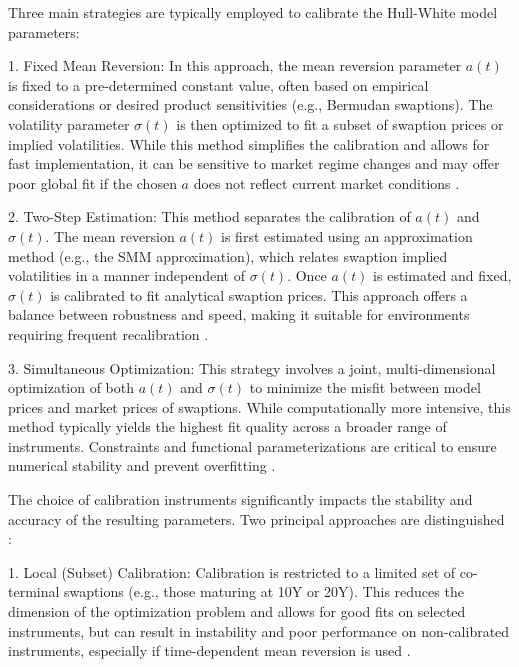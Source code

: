 Three main strategies are typically employed to calibrate the Hull-White model parameters:

1. Fixed Mean Reversion: In this approach, the mean reversion parameter $a(t)$ is fixed to a pre-determined constant value, often based on empirical considerations or desired product sensitivities (e.g., Bermudan swaptions). The volatility parameter $\sigma(t)$ is then optimized to fit a subset of swaption prices or implied volatilities. While this method simplifies the calibration and allows for fast implementation, it can be sensitive to market regime changes and may offer poor global fit if the chosen $a$ does not reflect current market conditions \parencite[p.~13]{gurrieri2009calibration}.

2. Two-Step Estimation: This method separates the calibration of $a(t)$ and $\sigma(t)$. The mean reversion $a(t)$ is first estimated using an approximation method (e.g., the SMM approximation), which relates swaption implied volatilities in a manner independent of $\sigma(t)$. Once $a(t)$ is estimated and fixed, $\sigma(t)$ is calibrated to fit analytical swaption prices. This approach offers a balance between robustness and speed, making it suitable for environments requiring frequent recalibration \parencite[pp.~13--14]{gurrieri2009calibration}.

3. Simultaneous Optimization: This strategy involves a joint, multi-dimensional optimization of both $a(t)$ and $\sigma(t)$ to minimize the misfit between model prices and market prices of swaptions. While computationally more intensive, this method typically yields the highest fit quality across a broader range of instruments. Constraints and functional parameterizations are critical to ensure numerical stability and prevent overfitting \parencite[p.~14]{gurrieri2009calibration}.

The choice of calibration instruments significantly impacts the stability and accuracy of the resulting parameters. Two principal approaches are distinguished \parencite[p.~16]{gurrieri2009calibration}:

1. Local (Subset) Calibration: Calibration is restricted to a limited set of co-terminal swaptions (e.g., those maturing at 10Y or 20Y). This reduces the dimension of the optimization problem and allows for good fits on selected instruments, but can result in instability and poor performance on non-calibrated instruments, especially if time-dependent mean reversion is used \parencite[pp.~16--24]{gurrieri2009calibration}.


